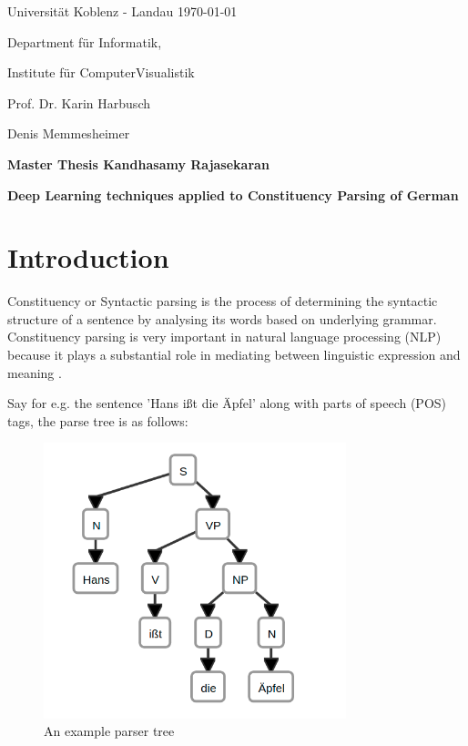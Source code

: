 \documentclass[a4paper, 11pt]{article}
\newcommand{\myName}{Kandhasamy Rajasekaran}
\newcommand{\Title}{Deep Learning techniques applied to Constituency Parsing of German}
\newcommand{\subject}{Institute f\"{u}r ComputerVisualistik}
\newcommand{\supervisor}{Prof. Dr. Karin Harbusch} %
\newcommand{\secondSupervisor}{Denis Memmesheimer} %
\newcommand{\type}{Master Thesis}
\begin{document}
Universit\"{a}t Koblenz - Landau \hfill \today

Department f\"{u}r Informatik,

\subject{}

\supervisor{}

\secondSupervisor{}

\begin{center}
	\large{\bf \type{}  \myName{}}

	\vspace*{0.5cm}

	\large{\bf \Title}
\end{center}

\setlength{\parskip}{1.5ex plus0.5ex minus 0.5ex}


\section{Introduction}
\frenchspacing

Constituency or Syntactic parsing is the process of determining the syntactic structure of a sentence by analysing its words based on underlying grammar. Constituency parsing is very important in natural language processing (NLP) because it plays a substantial role in mediating between linguistic expression and meaning \parencite*{Socher}. 

Say for e.g. the sentence 'Hans ißt die Äpfel' along with parts of speech (POS) tags, the parse tree is as follows:

\begin{figure}[htpb]
    \centering
    \includegraphics[width=\textwidth,height=8cm,keepaspectratio=true]
    {hans-eats-apples.png}
    \caption{
        An example parser tree
    }
    \label{fig:An example parser tree network}
\end{figure}
\end{document}
